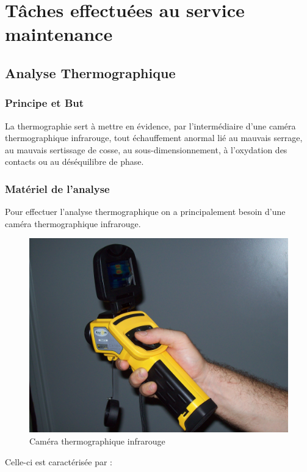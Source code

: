 \section{Tâches effectuées au service maintenance}

\subsection{Analyse Thermographique}

\subsubsection{Principe et But}

La thermographie sert à mettre en évidence, par l'intermédiaire d'une caméra thermographique infrarouge, tout échauffement anormal lié au mauvais serrage, au mauvais sertissage de cosse, au sous-dimensionnement, à l'oxydation des contacts ou au déséquilibre de phase.

\subsubsection{Matériel de l'analyse}


Pour effectuer l'analyse thermographique on a principalement besoin d'une caméra thermographique infrarouge.
\begin{figure}[hbtp]
\centering
\includegraphics[scale=0.07]{./Figures/infra.JPG}
\caption{Caméra thermographique infrarouge}
\end{figure}
Celle-ci est caractérisée par :

